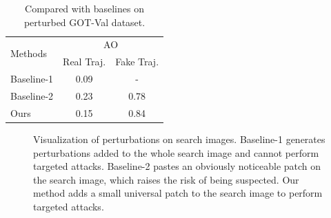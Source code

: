 \documentclass[journal]{IEEEtran}
\begin{document}
\begin{table}[t]
  \centering
  \caption{Compared with baselines on perturbed GOT-Val dataset.}
  \begin{tabular}{@{}lcc@{}}
    \toprule
    \multirow{2}{*}[-2pt]{Methods}  & \multicolumn{2}{c}{AO}\\ \cmidrule{2-3}
          & Real Traj. & Fake Traj.\\ \midrule
  Baseline-1 \cite{UAP}  & 0.09          & -\\
  Baseline-2 \cite{patch}   & 0.23       & 0.78\\
    Ours & 0.15       & 0.84\\ \bottomrule
    \end{tabular}
  \label{tab:imperceptible}
\end{table}
  
\begin{figure}[t]
  \centering
  \caption{Visualization of perturbations on search images. Baseline-1 generates perturbations added to the whole search image and cannot perform targeted attacks. Baseline-2 pastes an obviously noticeable patch on the search image, which raises the risk of being suspected. Our method adds a small universal patch to the search image to perform targeted attacks.}
  \label{fig:imperceptible}
\end{figure}
\end{document}
